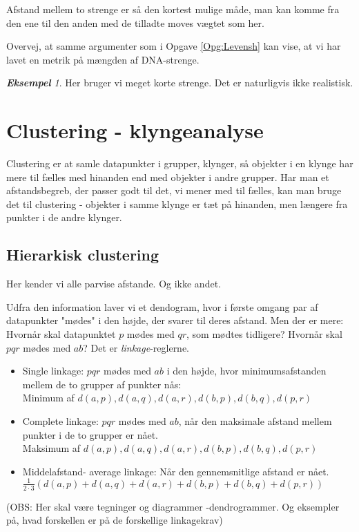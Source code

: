 \documentclass[a4paper, 12pt]{article}
\theoremstyle{remark}
\newtheorem{Eksempel}{\textbf{Eksempel}}
\begin{document}
Afstand mellem to strenge er så den kortest mulige måde, man kan komme fra den ene til den anden med de tilladte moves vægtet som her. 

Overvej, at samme argumenter som i Opgave \ref{Opg:Levensh} kan vise, at vi har lavet en metrik på mængden af DNA-strenge.

\begin{Eksempel} 
Her bruger vi meget korte strenge. Det er naturligvis ikke realistisk. 

\end{Eksempel}


\section*{Clustering - klyngeanalyse}

Clustering er at samle datapunkter i grupper, klynger, så objekter i en klynge har mere til fælles med hinanden end med objekter i andre grupper. Har man et afstandsbegreb, der passer godt til det, vi mener med til fælles, kan man bruge det til clustering - objekter i samme klynge er tæt på hinanden, men længere fra punkter i de andre klynger. 
\subsection*{Hierarkisk clustering}
Her kender vi alle parvise afstande. Og ikke andet. 

Udfra den information laver vi et dendogram, hvor i første omgang par af datapunkter "mødes"\; i den højde, der svarer til deres afstand. Men der er mere: Hvornår skal datapunktet $p$ mødes med $qr$, som mødtes tidligere? Hvornår skal $pqr$ mødes med $ab$?  Det er \emph{linkage}-reglerne.
\begin{itemize}
\item Single linkage: $pqr$ mødes med $ab$ i den højde, hvor minimumsafstanden mellem de to grupper af punkter nås:\\ Minimum af $d(a,p),d(a,q), d(a,r), d(b,p), d(b,q), d(p,r)$
\item Complete linkage: $pqr$ mødes med $ab$, når den maksimale afstand mellem punkter i de to grupper er nået. \\Maksimum af $d(a,p),d(a,q), d(a,r), d(b,p), d(b,q), d(p,r)$
\item Middelafstand- average linkage: Når den gennemsnitlige afstand er nået. $\frac{1}{2\cdot 3}(d(a,p)+d(a,q)+ d(a,r)+ d(b,p)+ d(b,q)+ d(p,r))$
\end{itemize}
(OBS: Her skal være tegninger og diagrammer -dendrogrammer. Og eksempler på, hvad forskellen er på de forskellige linkagekrav)
\end{document}
